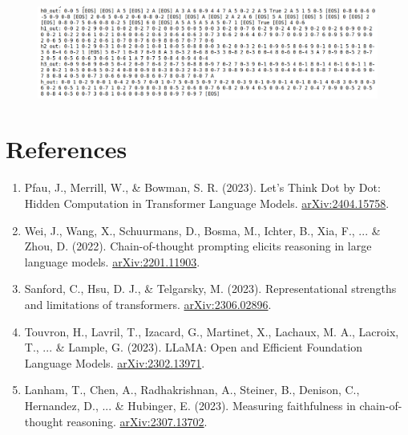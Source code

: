 \documentclass[10pt,a4paper]{article}
\begin{document}
\begin{figure}[p]
    \vspace{0.5em}
    
    \includegraphics[width=\textwidth,height=0.19\textheight,keepaspectratio]{random_tokens_decoding.png}
    \label{fig:random}
\end{figure}

\clearpage
\section{References}

\begin{enumerate}
\item Pfau, J., Merrill, W., \& Bowman, S. R. (2023). Let's Think Dot by Dot: Hidden Computation in Transformer Language Models. \href{https://arxiv.org/abs/2404.15758}{arXiv:2404.15758}.

\item Wei, J., Wang, X., Schuurmans, D., Bosma, M., Ichter, B., Xia, F., ... \& Zhou, D. (2022). Chain-of-thought prompting elicits reasoning in large language models. \href{https://arxiv.org/abs/2201.11903}{arXiv:2201.11903}.

\item Sanford, C., Hsu, D. J., \& Telgarsky, M. (2023). Representational strengths and limitations of transformers. \href{https://arxiv.org/abs/2306.02896}{arXiv:2306.02896}.

\item Touvron, H., Lavril, T., Izacard, G., Martinet, X., Lachaux, M. A., Lacroix, T., ... \& Lample, G. (2023). LLaMA: Open and Efficient Foundation Language Models. \href{https://arxiv.org/abs/2302.13971}{arXiv:2302.13971}.

\item Lanham, T., Chen, A., Radhakrishnan, A., Steiner, B., Denison, C., Hernandez, D., ... \& Hubinger, E. (2023). Measuring faithfulness in chain-of-thought reasoning. \href{https://arxiv.org/abs/2307.13702}{arXiv:2307.13702}.
\end{enumerate}
\end{document}
